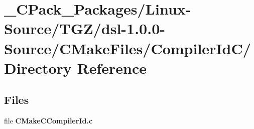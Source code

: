 \section{\_\-CPack\_\-Packages/Linux-\/Source/TGZ/dsl-\/1.0.0-\/Source/CMakeFiles/CompilerIdC/ Directory Reference}
\label{dir_0006e4b4a462a17a91d872da0841e949}
\subsection*{Files}
\begin{DoxyCompactItemize}
\item 
file {\bf CMakeCCompilerId.c}
\end{DoxyCompactItemize}
